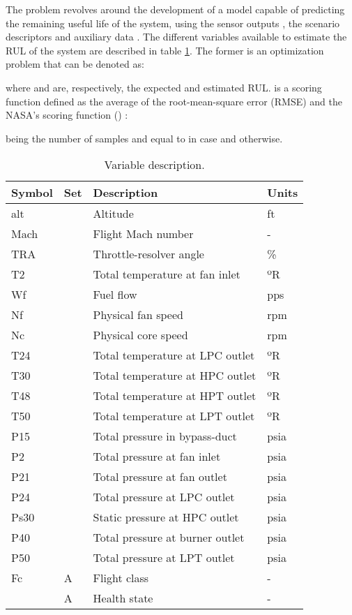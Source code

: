 \documentclass[PHM, 2021]{PHMSociety}
\begin{document}
The problem revolves around the development of a model  capable of predicting the remaining useful life  of the system, using the sensor outputs , the scenario descriptors  and auxiliary data . The different variables available to estimate the RUL of the system are described in table \ref{table:variables}. The former is an optimization problem that can be denoted as:



where  and  are, respectively, the expected and estimated RUL.  is a scoring function defined as the average of the root-mean-square error (RMSE) and the NASA's scoring function () \cite{saxena2008damage}:





being  the number of samples and  equal to  in case  and  otherwise.

\begin{table}[]
\caption{Variable description.}
\begin{tabular}{llll}
\hline
Symbol & Set & Description                     & Units \\ \hline
alt    &    & Altitude                        & ft    \\
Mach   &    & Flight Mach number              & -     \\
TRA    &    & Throttle-resolver angle         & \%     \\
T2     &    & Total temperature at fan inlet  & ºR    \\
Wf     &  & Fuel flow                       & pps   \\
Nf     &  & Physical fan speed              & rpm   \\
Nc     &  & Physical core speed             & rpm   \\
T24    &  & Total temperature at LPC outlet & ºR    \\
T30    &  & Total temperature at HPC outlet & ºR    \\
T48    &  & Total temperature at HPT outlet & ºR    \\
T50    &  & Total temperature at LPT outlet & ºR    \\
P15    &  & Total pressure in bypass-duct   & psia  \\
P2     &  & Total pressure at fan inlet     & psia  \\
P21    &  & Total pressure at fan outlet    & psia  \\
P24    &  & Total pressure at LPC outlet    & psia  \\
Ps30   &  & Static pressure at HPC outlet   & psia  \\
P40    &  & Total pressure at burner outlet & psia  \\
P50    &  & Total pressure at LPT outlet    & psia  \\
Fc     & A   & Flight class                    & -     \\
    & A   & Health state                    & -    
\end{tabular}
\label{table:variables}
\end{table}
\end{document}
